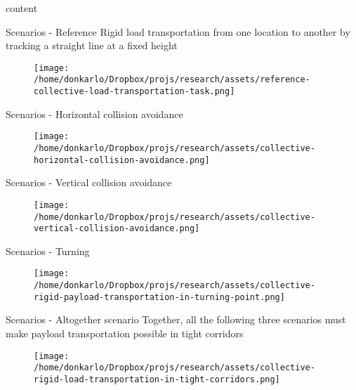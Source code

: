 \documentclass[unknownkeysallowed]{beamer}
\begin{document}
	\begin{frame}{}
		content
	\end{frame}

	\begin{frame}{Scenarios - Reference}
		Rigid load transportation from one location to another by tracking a straight line at a fixed height 
		\begin{figure}
			\centering
			\texttt{[image: /home/donkarlo/Dropbox/projs/research/assets/reference-collective-load-transportation-task.png]}
		\end{figure}
	\end{frame}

	\begin{frame}{Scenarios - Horizontal collision avoidance}
		\begin{figure}
			\centering
			\texttt{[image: /home/donkarlo/Dropbox/projs/research/assets/collective-horizontal-collision-avoidance.png]}
		\end{figure}
	\end{frame}

	\begin{frame}{Scenarios - Vertical collision avoidance}
		\begin{figure}
			\centering
			\texttt{[image: /home/donkarlo/Dropbox/projs/research/assets/collective-vertical-collision-avoidance.png]}
		\end{figure}
	\end{frame}

	\begin{frame}{Scenarios - Turning}
		\begin{figure}
			\centering
			\texttt{[image: /home/donkarlo/Dropbox/projs/research/assets/collective-rigid-payload-transportation-in-turning-point.png]}
		\end{figure}
	\end{frame}

	\begin{frame}{Scenarios - Altogether scenario}
		Together, all the following three scenarios must make payload transportation possible in tight corridors
		\begin{figure}
			\centering
			\texttt{[image: /home/donkarlo/Dropbox/projs/research/assets/collective-rigid-load-transportation-in-tight-corridors.png]}
		\end{figure}
	\end{frame}
	
\end{document}

